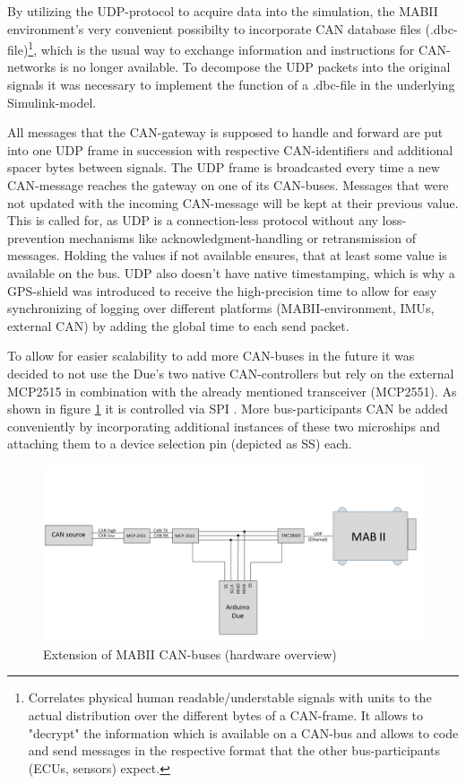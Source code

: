 \documentclass[ExampleMasters.tex]{subfiles}
\begin{document}
By utilizing the \gls{UDP}-protocol to acquire data into the simulation, the \gls{MABII} environment's very convenient possibilty to incorporate \gls{CAN} database files (.dbc-file)\footnote{Correlates physical human readable/understable signals with units to the actual distribution over the different bytes of a \gls{CAN}-frame. It allows to "decrypt" the information which is available on a \gls{CAN}-bus and allows to code and send messages in the respective format that the other bus-participants (ECUs, sensors) expect.}, which is the usual way to exchange information and instructions for \gls{CAN}-networks is no longer available. To decompose the \gls{UDP} packets into the original signals it was necessary to implement the function of a .dbc-file in the underlying Simulink-model. 

All messages that the CAN-gateway is supposed to handle and forward are put into one \gls{UDP} frame in succession with respective CAN-identifiers and additional spacer bytes between signals. The \gls{UDP} frame is broadcasted every time a new CAN-message reaches the gateway on one of its \gls{CAN}-buses. Messages that were not updated with the incoming \gls{CAN}-message will be kept at their previous value. This is called for, as \gls{UDP} is a connection-less protocol without any loss-prevention mechanisms like acknowledgment-handling or retransmission of messages. Holding the values if not available ensures, that at least some value is available on the bus. \gls{UDP} also doesn't have native timestamping, which is why a \gls{GPS}-shield was introduced to receive the high-precision time to allow for easy synchronizing of logging over different platforms (\gls{MABII}-environment, \gls{IMU}s, external \gls{CAN}) by adding the global time to each send packet.

To allow for easier scalability to add more CAN-buses in the future it was decided to not use the Due's two native CAN-controllers but rely on the external MCP2515 in combination with the already mentioned transceiver (MCP2551). As shown in figure \ref{fig:can_extension} it is controlled via \gls{SPI} . More bus-participants \gls{CAN} be added conveniently by incorporating additional instances of these two microships and attaching them to a device selection pin (depicted as SS) each.\\




\begin{figure}[!htb]
\centering
\includegraphics[width=1\linewidth]{figures/can_extension}
\caption{Extension of \gls{MABII} \gls{CAN}-buses (hardware overview)}
\label{fig:can_extension}
\end{figure}
\end{document}
